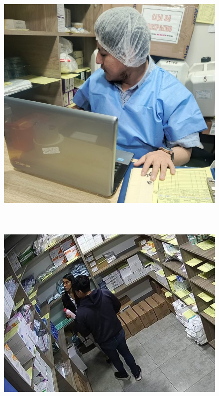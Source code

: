 \begin{figure}[H]
  {\includegraphics[width=15cm, height=11cm]{images/foto3.jpg}}
  {\includegraphics[width=15cm, height=11cm]{images/foto4.jpg}}
\end{figure}

\newpage
